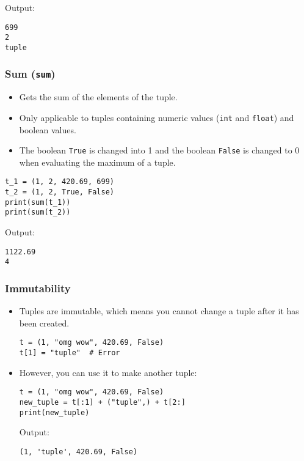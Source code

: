 \documentclass[11pt]{article}
\begin{document}
 \noindent Output:

\label{orge6d5723}
\begin{verbatim}
699
2
tuple
\end{verbatim}
\subsubsection{Sum (\texttt{sum})}
\label{sec:org4baab78}
\begin{itemize}
\item Gets the sum of the elements of the tuple.
\item Only applicable to tuples containing numeric values (\texttt{int} and \texttt{float}) and boolean values.
\item The boolean \texttt{True} is changed into 1 and the boolean \texttt{False} is changed to 0 when evaluating the maximum of a tuple.
\end{itemize}

\begin{verbatim}
t_1 = (1, 2, 420.69, 699)
t_2 = (1, 2, True, False)
print(sum(t_1))
print(sum(t_2))
\end{verbatim}

 \noindent Output:

\label{org1fc4893}
\begin{verbatim}
1122.69
4
\end{verbatim}
\subsubsection{Immutability}
\label{sec:org07f2dad}
\begin{itemize}
\item Tuples are immutable, which means you cannot change a tuple after it has been created.
\begin{verbatim}
t = (1, "omg wow", 420.69, False)
t[1] = "tuple"  # Error
\end{verbatim}

\item However, you can use it to make another tuple:
\begin{verbatim}
t = (1, "omg wow", 420.69, False)
new_tuple = t[:1] + ("tuple",) + t[2:]
print(new_tuple)
\end{verbatim}

 \noindent Output:

\label{orge16d52a}
\begin{verbatim}
(1, 'tuple', 420.69, False)
\end{verbatim}
\end{itemize}
\end{document}
